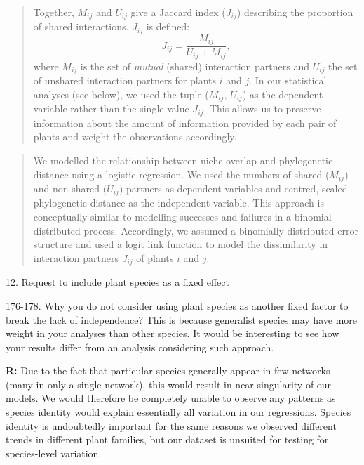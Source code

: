 \documentclass[12pt]{letter}
\newenvironment{refquote}{\bigskip \begin{it}}{\end{it}\smallskip}
\begin{document}
		\begin{quotation}

			Together, $M_{ij}$ and $U_{ij}$ give a Jaccard index ($J_{ij}$) describing 
			the proportion of shared interactions. $J_{ij}$ is defined: 
			\begin{equation}
			J_{ij} = \frac{M_{ij}}{U_{ij}+M_{ij}} ,
			\end{equation}
			where $M_{ij}$ is the set of \emph{mutual} (shared) interaction partners and $U_{ij}$ the set of unshared interaction partners for plants $i$ and $j$.
			In our statistical analyses (see below), we used the tuple ($M_{ij}$, $U_{ij}$) as the
			dependent variable rather than the single value $J_{ij}$. 
			This allows us to preserve information about the amount of information provided by each pair of plants and weight the observations accordingly.

		\end{quotation}

		\smallskip

		\begin{quotation}

			We modelled the relationship between niche overlap and phylogenetic 
			distance using a logistic regression. We used the numbers of shared 
			($M_{ij}$) and non-shared ($U_{ij}$) partners as dependent variables and 
			centred, scaled phylogenetic distance as the independent variable. This 
			approach is conceptually similar to modelling successes and failures in a 
			binomial-distributed process. Accordingly, we assumed a binomially-distributed error structure and used a logit link function to model the dissimilarity in interaction partners 
			$J_{ij}$ of plants $i$ and $j$.

		\end{quotation}


	12. Request to include plant species as a fixed effect

		\begin{refquote}
			176-178. Why you do not consider using plant species as another fixed factor to break the lack of independence? This is because generalist species may have more weight in your analyses than other species. It would be interesting to see how your results differ from an analysis considering such approach.
		\end{refquote}

		\textbf{R:} Due to the fact that particular species generally appear in few networks (many in only a single network), this would result in near singularity of our models. We would therefore be completely unable to observe any patterns as species identity would explain essentially all variation in our regressions. Species identity is undoubtedly important for the same reasons we observed different trends in different plant families, but our dataset is unsuited for testing for species-level variation.
\end{document}
